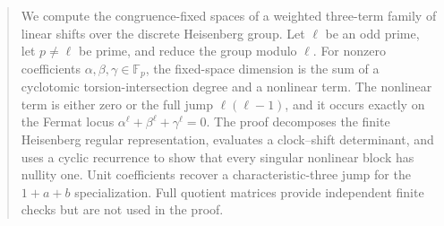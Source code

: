 \begin{abstract}
We compute the congruence-fixed spaces of a weighted three-term family of
linear shifts over the discrete Heisenberg group.  Let $\ell$ be an odd prime,
let $p\ne\ell$ be prime, and reduce the group modulo $\ell$.  For nonzero
coefficients $\alpha,\beta,\gamma\in\mathbb F_p$, the fixed-space dimension is
the sum of a cyclotomic torsion-intersection degree and a nonlinear term.  The
nonlinear term is either zero or the full jump $\ell(\ell-1)$, and it occurs
exactly on the Fermat locus
$\alpha^\ell+\beta^\ell+\gamma^\ell=0$.  The proof decomposes the finite
Heisenberg regular representation, evaluates a clock--shift determinant, and
uses a cyclic recurrence to show that every singular nonlinear block has
nullity one.  Unit coefficients recover a characteristic-three jump for the
$1+a+b$ specialization.  Full quotient matrices provide independent finite
checks but are not used in the proof.
\end{abstract}

